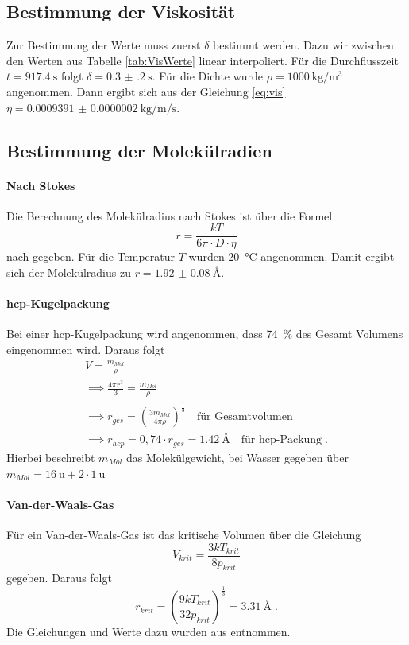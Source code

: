\subsection{Bestimmung der Viskosität}
Zur Bestimmung der Werte muss zuerst $\delta$ bestimmt werden. Dazu wir zwischen den Werten aus Tabelle \ref{tab:VisWerte}
linear interpoliert. Für die Durchflusszeit $t = \SI{917 .4}{\second}$ folgt $\delta = \SI{0.3(2)}{\second}$. Für die
Dichte wurde $\rho = \SI{1000}{\kilo\gram\per \cubic\meter}$ angenommen. Dann ergibt sich
aus der Gleichung \eqref{eq:vis} $\eta = \SI{0.0009391(2)}{\kilo\gram\per\meter\per\second}$.
\subsection{Bestimmung der Molekülradien}
\paragraph{Nach Stokes}
Die Berechnung des Molekülradius nach Stokes ist über die Formel
\begin{equation}
r = \frac{kT}{6\pi \cdot D \cdot \eta}
\end{equation}
nach \cite{Anleitung} gegeben. Für die Temperatur $T$ wurden \SI{20}{\celsius} angenommen. Damit ergibt sich der
Molekülradius zu $r = \SI{1.92(8)}{\angstrom}$.
\paragraph{hcp-Kugelpackung}
Bei einer hcp-Kugelpackung wird angenommen, dass \SI{74}{\percent} des Gesamt Volumens eingenommen wird. Daraus folgt
\begin{gather}
V = \frac{m_{Mol}}{\rho} \\
\implies \frac{4\pi r^3}{3} =\frac{m_{Mol}}{\rho} \\
\implies r_{ges} = \left( \frac{3m_{Mol}}{4\pi \rho } \right)^{\frac{1}{3}} \quad \text{für Gesamtvolumen} \\
\implies r_{hcp} = 0,74 \cdot r_{ges} = \SI{1,42}{\angstrom} \quad \text{für hcp-Packung} \; .
\end{gather}
Hierbei beschreibt $m_{Mol}$ das Molekülgewicht, bei Wasser gegeben über $m_{Mol} = \SI{16}{\atomicmassunit} + 2\cdot \SI{1}{\atomicmassunit}$
\paragraph{Van-der-Waals-Gas}
Für ein Van-der-Waals-Gas ist das kritische Volumen über die Gleichung
\begin{equation}
V_{krit}= \frac{3kT_{krit}}{8p_{krit}}
\end{equation}
gegeben. Daraus folgt
\begin{equation}
r_{krit} = \left( \frac{9kT_{krit}}{32p_{krit}} \right)^{\frac{1}{3}} = \SI{3,31}{\angstrom} \;.
\end{equation}
Die Gleichungen und Werte dazu wurden aus \cite{spektrum} entnommen.
